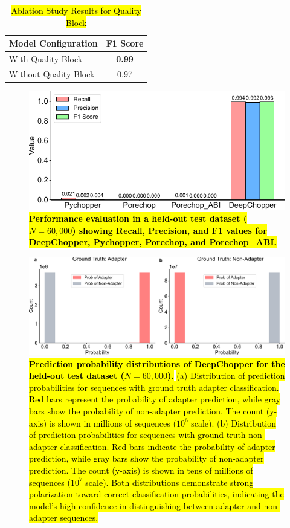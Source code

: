 \documentclass[pdflatex,sn-nature, lineno]{sn-jnl}%
\begin{document}
\begin{table}[ht]
	\centering
	\caption{\hl{Ablation Study Results for Quality Block}}
	\begin{tabular}{lc}
		\toprule
		\textbf{Model Configuration} & \textbf{F1 Score} \\
		\midrule
		With Quality Block           & \textbf{0.99}     \\
		Without Quality Block        & 0.97              \\
		\bottomrule
	\end{tabular}
	\label{tab:st2}
\end{table}



\begin{figure}[!ht]
	\includegraphics[height=0.4\columnwidth]{finals/sf1}
	\caption{{\bf \hl{Performance evaluation in a held-out test dataset ($N=60,000$) showing Recall, Precision, and F1 values for DeepChopper, Pychopper, Porechop, and Porechop\_ABI.}}}\label{fig:sf1}
\end{figure}

\begin{figure}[!ht]
	\includegraphics[height=0.35\columnwidth]{finals/adaprob}
	\caption{{\bf \hl{Prediction probability distributions of DeepChopper for the held-out test dataset  ($N=60,000$).}} \hl{(a) Distribution of prediction probabilities for sequences with ground truth adapter classification. Red bars represent the probability of adapter prediction, while gray bars show the probability of non-adapter prediction. The count (y-axis) is shown in millions of sequences ($10^6$ scale). (b) Distribution of prediction probabilities for sequences with ground truth non-adapter classification. Red bars indicate the probability of adapter prediction, while gray bars show the probability of non-adapter prediction. The count (y-axis) is shown in tens of millions of sequences ($10^7$ scale). Both distributions demonstrate strong polarization toward correct classification probabilities, indicating the model's high confidence in distinguishing between adapter and non-adapter sequences.}}\label{fig:adaprob}
\end{figure}
\end{document}
